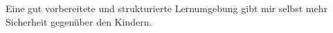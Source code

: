 Eine gut vorbereitete und strukturierte Lernumgebung gibt mir selbst mehr Sicherheit gegenüber den Kindern.